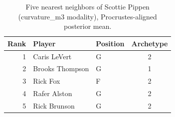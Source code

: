 \begin{table}[htbp]
  \centering\small
  \begin{tabular}{rllc}
    \toprule
    Rank & Player & Position & Archetype \\
    \midrule
    1 & Caris LeVert & G & 2 \\
    2 & Brooks Thompson & G & 1 \\
    3 & Rick Fox & F & 2 \\
    4 & Rafer Alston & G & 2 \\
    5 & Rick Brunson & G & 2 \\
    \bottomrule
  \end{tabular}
  \caption{Five nearest neighbors of Scottie Pippen (curvature_m3 modality), Procrustes-aligned posterior mean.}
  \label{tab:Scottie_Pippen_neighbors_curvature_m3}
\end{table}

